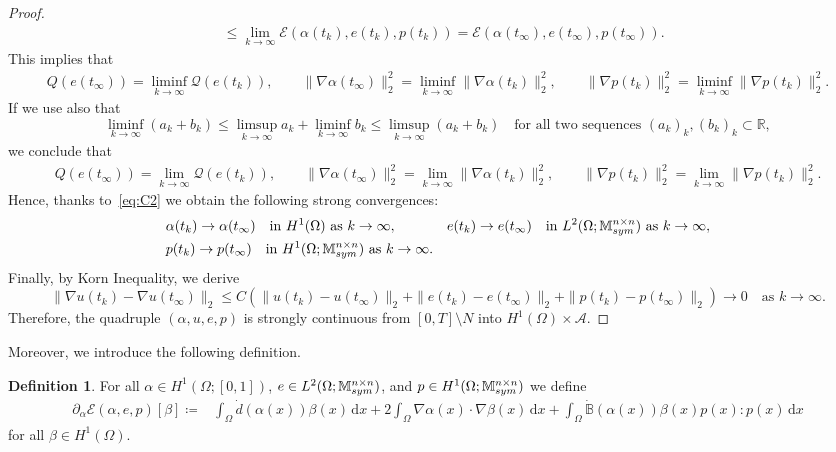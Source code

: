 \documentclass[reqno]{amsart}
\theoremstyle{definition}
\newtheorem{definition}[corollary]{Definition}
\numberwithin{equation}{section}
\def\de {\mathrm{d}}
\def\R {\mathbb R}
\def\M {\mathbb M^{n\times n}_{\rm sym}}
\def\B {\mathbb B}
\begin{document}
\begin{proof}
\begin{align*}
&\le \lim_{k\to\infty}\mathcal E(\alpha(t_k),e(t_k),p(t_k))=\mathcal E(\alpha(t_\infty),e(t_\infty),p(t_\infty)).
\end{align*}
This implies that
\begin{align*}
Q(e(t_\infty))=\liminf_{k\to\infty}\mathcal Q(e(t_k)),\qquad \|\nabla\alpha(t_\infty)\|_2^2=\liminf_{k\to\infty}\|\nabla\alpha(t_k)\|_2^2,\qquad\|\nabla p(t_k)\|_2^2=\liminf_{k\to\infty}\|\nabla p(t_k)\|_2^2.    
\end{align*}
If we use also that
$$\liminf_{k\to\infty}(a_k+b_k)\le\limsup_{k\to\infty}a_k+\liminf_{k\to\infty}b_k\le \limsup_{k\to\infty}(a_k+b_k)\quad\text{for all two sequences $(a_k)_k,(b_k)_k\subset\R$},$$
we conclude that
\begin{align*}
Q(e(t_\infty))=\lim_{k\to\infty}\mathcal Q(e(t_k)),\qquad \|\nabla\alpha(t_\infty)\|_2^2=\lim_{k\to\infty}\|\nabla\alpha(t_k)\|_2^2,\qquad\|\nabla p(t_k)\|_2^2=\lim_{k\to\infty}\|\nabla p(t_k)\|_2^2.    
\end{align*}
Hence, thanks to~\eqref{eq:C2} we obtain the following strong convergences:
\begin{align*}
&\alpha(t_k)\to \alpha(t_\infty)\quad\text{in $H^1(\Omega)$ as $k\to\infty$},&
& e(t_k)\to e(t_\infty)\quad\text{in $L^2(\Omega;\M)$ as $k\to\infty$},\\
& p(t_k)\to p(t_\infty)\quad\text{in $H^1(\Omega;\M)$ as $k\to\infty$}.
\end{align*}
Finally, by Korn Inequality, we derive
$$\|\nabla u(t_k)-\nabla u(t_\infty)\|_2\le C\left(\|u(t_k)-u(t_\infty)\|_2+\|e(t_k)-e(t_\infty)\|_2+\|p(t_k)-p(t_\infty)\|_2\right)\to 0\quad\text{as $k\to\infty$}.$$
Therefore, the quadruple $(\alpha,u,e,p)$ is strongly continuous from $[0,T]\setminus N$ into $H^1(\Omega)\times \mathcal A$.
\end{proof}

Moreover, we introduce the following definition.

\begin{definition}
For all $\alpha\in H^1(\Omega;[0,1])$, $e\in L^2(\Omega;\M)$, and $p\in H^1(\Omega;\M)$ we define 
\begin{align*}
\partial_\alpha \mathcal E(\alpha,e,p)[\beta]\coloneqq &\int_\Omega \dot{d}(\alpha(x))\beta(x) \,\de x+2\int_\Omega \nabla\alpha(x)\cdot\nabla\beta(x) \,\de x+\int_\Omega \dot{\B}(\alpha(x))\beta(x)p(x):p(x) \,\de x
\end{align*}
 for all $\beta\in H^1(\Omega)$.
 \end{definition}
 
\end{document}
